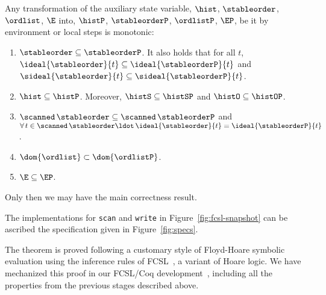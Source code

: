 \begin{lemma}\label{lem:ghosts-mono}%
Any transformation of the auxiliary state variable, $\hist$,
$\stableorder$, $\ordlist$, $\E$ into, $\histP$, $\stableorderP$,
$\ordlistP$, $\EP$, be it by environment or local steps is monotonic:
%
\begin{enumerate}
 \item\label{lem:stableorder-mono} $\stableorder \subseteq
   \stableorderP$. It also holds that for all $t$,
   $\ideal{\stableorder}{t} \subseteq \ideal{\stableorderP}{t}$ and
   $\sideal{\stableorder}{t} \subseteq \sideal{\stableorderP}{t}$.

 \item\label{lem:hist-mono} $\hist \subseteq \histP$. Moreover,
   $\histS \subseteq \histSP$ and $\histO \subseteq \histOP$.

 \item\label{lem:scanned-mono} $\scanned\, \stableorder \subseteq
   \scanned\, \stableorderP$ and $\forall\, t \in \scanned\,
   \stableorder\ldot\, \ideal{\stableorder}{t} =
   \ideal{\stableorderP}{t}$.

 \item\label{lem:events-mono} $\dom{\ordlist} \subset \dom{\ordlistP}$.

 \item\label{lem:ends-mono} $\E \subseteq \EP $.
\end{enumerate}
\end{lemma}

 

Only then we may have the main correctness result.
\begin{theorem}\label{thm:specs}
The implementations for {\tt scan} and {\tt write} in
Figure~\ref{fig:fcsl-snapshot} can be ascribed the specification given
in Figure~\ref{fig:specs}.
\end{theorem}
%
The theorem is proved following a customary style of Floyd-Hoare
symbolic evaluation using the inference rules of
FCSL~\cite{NanevskiLSD+ESOP14}, a variant of Hoare logic. We have
mechanized this proof in our FCSL/Coq development~\cite{CoqFiles},
including all the properties from the previous stages described above.

